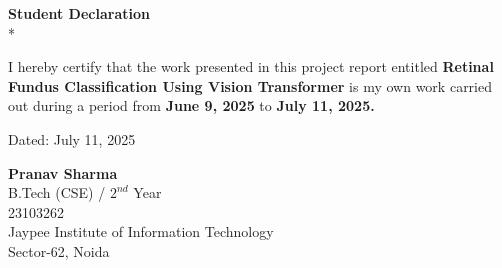 \documentclass[a4paper,12pt]{report}
\begin{document}
\clearpage


\begin{center}
\thispagestyle{empty}
{\fontsize{16pt}{20pt}\selectfont \textbf{Student Declaration}} \\*
\vspace{1cm}
\par  

I hereby certify that the work presented in this project report entitled {\bf Retinal Fundus Classification Using Vision Transformer} is my own work carried out during a period from \textbf{June 9, 2025} to \textbf{July 11, 2025.} \\

\vspace{1.9cm}

\begin{center}
\begin{minipage}{0.45\textwidth}
\raggedright
Dated: July 11, 2025
\end{minipage}
\hfill
\begin{minipage}{0.45\textwidth}
\raggedleft
\textbf{Pranav Sharma}\\
B.Tech (CSE) / $2^{nd}$ Year\\
23103262\\
Jaypee Institute of Information Technology\\
Sector-62, Noida
\end{minipage}
\end{center}

\vspace{2cm}






\end{center}
\end{document}

